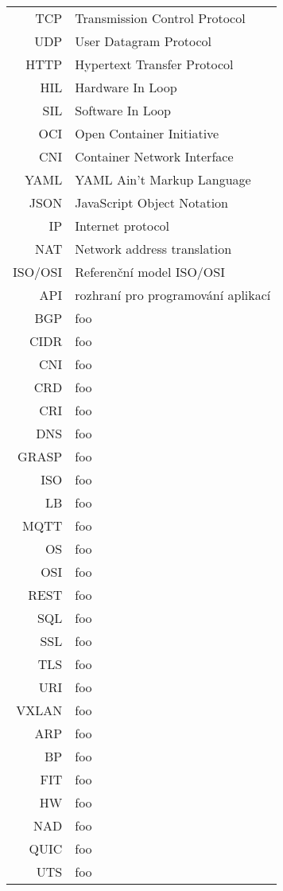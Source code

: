 


\begin{tabular}{rl}
TCP & Transmission Control Protocol\\
UDP & User Datagram Protocol\\
HTTP & Hypertext Transfer Protocol\\
HIL & Hardware In Loop\\
SIL & Software In Loop\\
OCI & Open Container Initiative\\
CNI & Container Network Interface\\
YAML & YAML Ain't Markup Language\\
JSON & JavaScript Object Notation \\
IP & Internet protocol\\
NAT & Network address translation\\
ISO/OSI & Referenční model ISO/OSI\\
API & rozhraní pro programování aplikací\\
BGP & foo\\
CIDR & foo\\
CNI & foo\\
CRD & foo\\
CRI & foo\\
DNS & foo\\
GRASP & foo\\
ISO & foo\\
LB & foo\\
MQTT & foo\\
OS & foo\\
OSI & foo\\
REST & foo\\
SQL & foo\\
SSL & foo\\
TLS & foo\\
URI & foo\\
VXLAN & foo\\
ARP & foo\\
BP & foo\\
FIT & foo\\
HW & foo\\
NAD & foo\\
QUIC & foo\\
UTS & foo\\
\end{tabular}